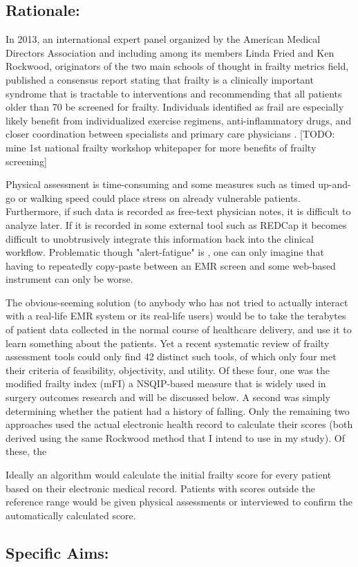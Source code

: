\subsection{Rationale:}\label{rationale}
In 2013, an international expert panel organized by the American Medical Directors Association and including among its members Linda Fried and Ken Rockwood, originators of the two main schools of thought in frailty metrics field, published a consensus report \cite{Morley_2013} stating that frailty is a clinically important syndrome that is tractable to interventions and recommending that all patients older than 70 be screened for frailty. Individuals identified as frail are especially likely benefit from individualized exercise regimens, anti-inflammatory drugs, and closer coordination between specialists and primary care physicians \citep{16392724}. [TODO: mine 1st national frailty workshop whitepaper for more benefits of frailty screening]

Physical assessment is time-consuming and some measures such as timed up-and-go or walking speed \cite{10811152} could place stress on already vulnerable patients. Furthermore, if such data is recorded as free-text physician notes, it is difficult to analyze later. If it is recorded in some external tool such as REDCap \cite{Harris_2009} it becomes difficult to unobtrusively integrate this information back into the clinical workflow. Problematic though "alert-fatigue" is \cite{Kesselheim_2011}, one can only imagine that having to repeatedly copy-paste between an EMR screen and some web-based instrument can only be worse. 

The obvious-seeming solution (to anybody who has not tried to actually interact with a real-life EMR system or its real-life users) would be to take the terabytes of patient data collected in the normal course of healthcare delivery, and use it to learn something about the patients. Yet a recent systematic review of frailty assessment tools \cite{McDonald_2016} could only find 42 distinct such tools, of which only four met their criteria of feasibility, objectivity, and utility. Of these four, one was the modified frailty index (mFI) \cite{Tsiouris_2013,22491599,23711971,Hodari_2013,Farhat_2012,23949353} a NSQIP-based measure that is widely used in surgery outcomes research and will be discussed below. A second was simply determining whether the patient had a history of falling. Only the remaining two approaches  used the actual electronic health record to calculate their scores (both derived using the same Rockwood \cite{Rockwood_2005} method that I intend to use in my study). Of these, the 

Ideally an algorithm would calculate the initial frailty score for every patient based on their electronic medical record. Patients with scores outside the reference range would be given physical assessments or interviewed to confirm the automatically calculated score.  

\subsection{Specific Aims:}\label{specific-aims}
